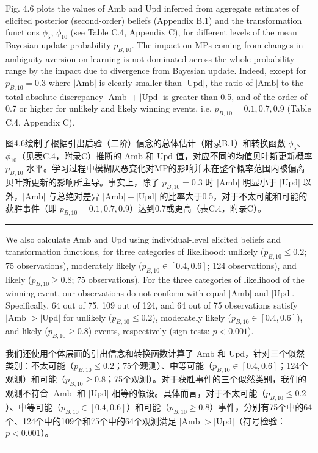 \documentclass[12pt,a4paper]{article}
\newenvironment{original}
  {\par\vspace{0.5em}\noindent\color{black}\ignorespaces}
  {\par\vspace{0.3em}}
\newenvironment{translation}
  {\par\noindent\color{transblue}\ignorespaces}
  {\par\vspace{0.8em}\hrule\vspace{0.5em}}
\begin{document}
\begin{original}
Fig. 4.6 plots the values of $\text{Amb}$ and $\text{Upd}$ inferred from aggregate estimates of elicited posterior (second-order) beliefs (Appendix B.1) and the transformation functions $\phi_5$, $\phi_{10}$ (see Table C.4, Appendix C), for different levels of the mean Bayesian update probability $p_{B,10}$. The impact on MPs coming from changes in ambiguity aversion on learning is not dominated across the whole probability range by the impact due to divergence from Bayesian update. Indeed, except for $p_{B,10} = 0.3$ where $|\text{Amb}|$ is clearly smaller than $|\text{Upd}|$, the ratio of $|\text{Amb}|$ to the total absolute discrepancy $|\text{Amb}| + |\text{Upd}|$ is greater than 0.5, and of the order of 0.7 or higher for unlikely and likely winning events, i.e. $p_{B,10} = 0.1, 0.7, 0.9$ (Table C.4, Appendix C).
\end{original}

\begin{translation}
图4.6绘制了根据引出后验（二阶）信念的总体估计（附录B.1）和转换函数 $\phi_5$、$\phi_{10}$（见表C.4，附录C）推断的 $\text{Amb}$ 和 $\text{Upd}$ 值，对应不同的均值贝叶斯更新概率 $p_{B,10}$ 水平。学习过程中模糊厌恶变化对MP的影响并未在整个概率范围内被偏离贝叶斯更新的影响所主导。事实上，除了 $p_{B,10} = 0.3$ 时 $|\text{Amb}|$ 明显小于 $|\text{Upd}|$ 以外，$|\text{Amb}|$ 与总绝对差异 $|\text{Amb}| + |\text{Upd}|$ 的比率大于0.5，对于不太可能和可能的获胜事件（即 $p_{B,10} = 0.1, 0.7, 0.9$）达到0.7或更高（表C.4，附录C）。
\end{translation}

\begin{original}
We also calculate $\text{Amb}$ and $\text{Upd}$ using individual-level elicited beliefs and transformation functions, for three categories of likelihood: unlikely ($p_{B,10} \leq 0.2$; 75 observations), moderately likely ($p_{B,10} \in [0.4, 0.6]$; 124 observations), and likely ($p_{B,10} \geq 0.8$; 75 observations). For the three categories of likelihood of the winning event, our observations do not conform with equal $|\text{Amb}|$ and $|\text{Upd}|$. Specifically, 64 out of 75, 109 out of 124, and 64 out of 75 observations satisfy $|\text{Amb}| > |\text{Upd}|$ for unlikely ($p_{B,10} \leq 0.2$), moderately likely ($p_{B,10} \in [0.4, 0.6]$), and likely ($p_{B,10} \geq 0.8$) events, respectively (sign-tests: $p < 0.001$).
\end{original}

\begin{translation}
我们还使用个体层面的引出信念和转换函数计算了 $\text{Amb}$ 和 $\text{Upd}$，针对三个似然类别：不太可能（$p_{B,10} \leq 0.2$；75个观测）、中等可能（$p_{B,10} \in [0.4, 0.6]$；124个观测）和可能（$p_{B,10} \geq 0.8$；75个观测）。对于获胜事件的三个似然类别，我们的观测不符合 $|\text{Amb}|$ 和 $|\text{Upd}|$ 相等的假设。具体而言，对于不太可能（$p_{B,10} \leq 0.2$）、中等可能（$p_{B,10} \in [0.4, 0.6]$）和可能（$p_{B,10} \geq 0.8$）事件，分别有75个中的64个、124个中的109个和75个中的64个观测满足 $|\text{Amb}| > |\text{Upd}|$（符号检验：$p < 0.001$）。
\end{translation}
\end{document}
